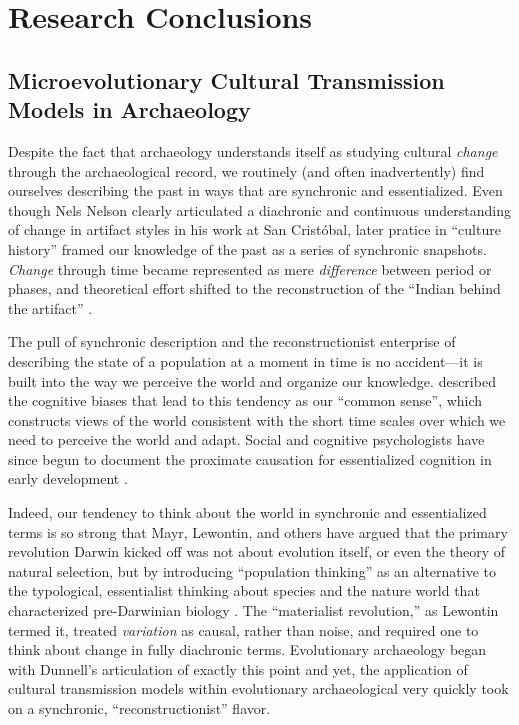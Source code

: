 
\section{Research Conclusions}\label{conc:sec:research-conclusions}






\subsection{Microevolutionary Cultural Transmission Models in Archaeology}\label{conc:sec:conc-microevolutionary}

Despite the fact that archaeology understands itself as studying cultural \emph{change} through the archaeological record, we routinely (and often inadvertently) find ourselves describing the past in ways that are synchronic and essentialized.  Even though Nels Nelson \citeyearpar{Nelson1916} clearly articulated a diachronic and continuous understanding of change in artifact styles in his work at San Crist\'obal, later pratice in ``culture history'' framed our knowledge of the past as a series of synchronic snapshots.  \emph{Change} through time became represented as mere \emph{difference} between period or phases, and theoretical effort shifted to the reconstruction of the ``Indian behind the artifact'' \citep[79]{braidwood1959archeology}.  

The pull of synchronic description and the reconstructionist enterprise of describing the state of a population at a moment in time is no accident---it is built into the way we perceive the world and organize our knowledge.   \citet{Dunnell1982} described the cognitive biases that lead to this tendency as our ``common sense'', which constructs views of the world consistent with the short time scales over which we need to perceive the world and adapt.  Social and cognitive psychologists have since begun to document the proximate causation for essentialized cognition in early development .  

Indeed, our tendency to think about the world in synchronic and essentialized terms is so strong that Mayr, Lewontin, and others have argued that the primary revolution Darwin kicked off was not about evolution itself, or even the theory of natural selection, but by introducing ``population thinking'' as an alternative to the typological, essentialist thinking about species and the nature world that characterized pre-Darwinian biology \citep{Dunnell1982,lewontin1974darwin,Mayr1959typological}.  The ``materialist revolution,'' as Lewontin termed it, treated \emph{variation} as causal, rather than noise, and required one to think about change in fully diachronic terms.  Evolutionary archaeology began with Dunnell's articulation of exactly this point \citep{Dunnell1978,Dunnell1980,Dunnell1982,Dunnell1989} and yet, the application of cultural transmission models within evolutionary archaeological very quickly took on a synchronic, ``reconstructionist'' flavor.  

